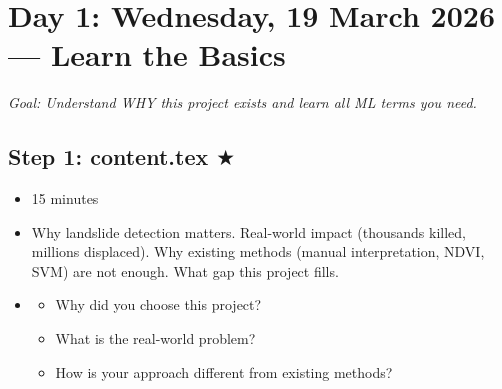 \documentclass[12pt,a4paper]{article}
\begin{document}
\section{Day 1: Wednesday, 19 March 2026 --- Learn the Basics}

\noindent\textit{Goal: Understand WHY this project exists and learn all ML terms you need.}

\begin{center}
\end{center}

\subsection*{Step 1: content.tex $\bigstar$}
\begin{itemize}[leftmargin=1.5cm]
    \item[\textbf{Time:}] 15 minutes
    \item[\textbf{What you learn:}] Why landslide detection matters. Real-world impact (thousands killed, millions displaced). Why existing methods (manual interpretation, NDVI, SVM) are not enough. What gap this project fills.
    \item[\textbf{After reading, you can answer:}]
    \begin{itemize}
        \item Why did you choose this project?
        \item What is the real-world problem?
        \item How is your approach different from existing methods?
    \end{itemize}
\end{itemize}
\end{document}
